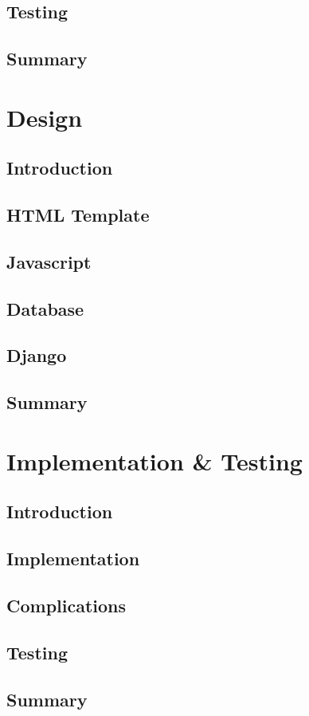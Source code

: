\documentclass[a4paper,12pt,oneside]{book}
\begin{document}
	\section{Testing}
		
	\section{Summary}
		
		
\chapter{Design}
	\section{Introduction}
		
	\section{HTML Template}
		
	\section{Javascript}
		
	\section{Database}
		
	\section{Django}
		
	\section{Summary}
		
		
\chapter{Implementation \& Testing}
	\section{Introduction}
		
	\section{Implementation}
		
	\section{Complications}
		
	\section{Testing}
		
	\section{Summary}
		
		

		


\renewcommand{\bibname}{Bibliography}

\end{document}
